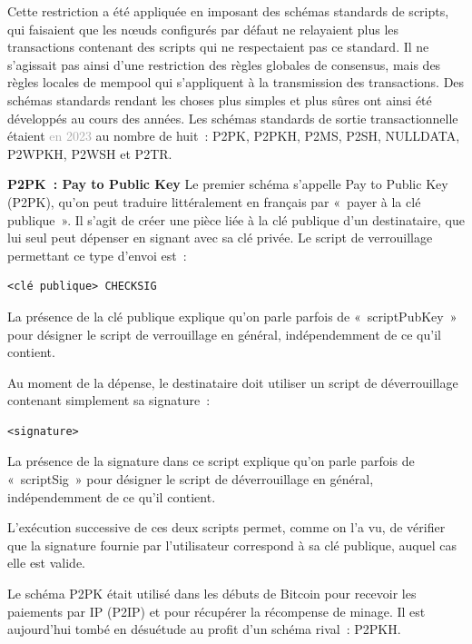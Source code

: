 Cette restriction a été appliquée en imposant des schémas standards de scripts, qui faisaient que les nœuds configurés par défaut ne relayaient plus les transactions contenant des scripts qui ne respectaient pas ce standard. Il ne s'agissait pas ainsi d'une restriction des règles globales de consensus, mais des règles locales de mempool qui s'appliquent à la transmission des transactions. Des schémas standards rendant les choses plus simples et plus sûres ont ainsi été développés au cours des années. Les schémas standards de sortie transactionnelle étaient \textcolor{darkgray}{en 2023} au nombre de huit~: P2PK, P2PKH, P2MS, P2SH, NULLDATA, P2WPKH, P2WSH et P2TR.


\textbf{P2PK~: Pay to Public Key} Le premier schéma s'appelle Pay to Public Key (P2PK), qu'on peut traduire littéralement en français par «~payer à la clé publique~». Il s'agit de créer une pièce liée à la clé publique d'un destinataire, que lui seul peut dépenser en signant avec sa clé privée. Le script de verrouillage permettant ce type d'envoi est~:

\begin{Verbatim}[fontsize=\footnotesize]
<clé publique> CHECKSIG
\end{Verbatim}

La présence de la clé publique explique qu'on parle parfois de «~scriptPubKey~» pour désigner le script de verrouillage en général, indépendemment de ce qu'il contient.

Au moment de la dépense, le destinataire doit utiliser un script de déverrouillage contenant simplement sa signature~:

\begin{Verbatim}[fontsize=\footnotesize]
<signature>
\end{Verbatim}

La présence de la signature dans ce script explique qu'on parle parfois de «~scriptSig~» pour désigner le script de déverrouillage en général, indépendemment de ce qu'il contient.

L'exécution successive de ces deux scripts permet, comme on l'a vu, de vérifier que la signature fournie par l'utilisateur correspond à sa clé publique, auquel cas elle est valide.

Le schéma P2PK était utilisé dans les débuts de Bitcoin pour recevoir les paiements par IP (P2IP) et pour récupérer la récompense de minage. Il est aujourd'hui tombé en désuétude au profit d'un schéma rival~: P2PKH.

